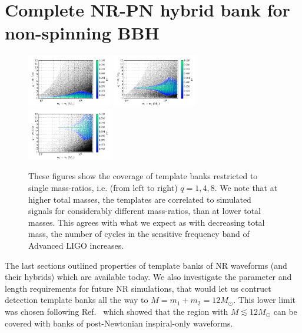 \section{Complete NR-PN hybrid bank for non-spinning BBH}\label{s1:futureNRpNhybridbank}

\begin{figure}
\begin{center}
\includegraphics[width=0.33\textwidth, trim=17 20 75 40]{figures/nrhybbank/bank_separate_q1_mtot200_match-tiny.png}
\includegraphics[width=0.33\textwidth, trim=17 20 75 40]{figures/nrhybbank/bank_separate_q4_mtot200_match-tiny.png}
\includegraphics[width=0.33\textwidth, trim=17 20 75 40]{figures/nrhybbank/bank_separate_q8_mtot200_match-tiny.png}
\caption{\label{fig:separate_q148} These figures show the coverage of template
  banks restricted to single mass-ratios, i.e. (from left to right) 
  $q = 1, 4, 8$. We note that at 
  higher total masses, the templates are correlated to simulated signals for
  considerably different mass-ratios, than at lower total masses. This agrees
  with what we expect as with decreasing total mass, the number of cycles in
  the sensitive frequency band of Advanced LIGO increases.} 
\end{center}
\end{figure}

The last sections outlined properties of template banks of NR
waveforms (and their hybrids) which are available today. 
We also investigate the parameter and length requirements for future NR 
simulations, that would let us contruct detection template banks all the
way to $M=m_1+m_2=12M_\odot$. This lower limit was chosen following 
Ref.~\cite{Brown:2012nn,CompTemplates2009} which showed that the region with
$M\lesssim 12M_\odot$ can be covered with banks of post-Newtonian inspiral-only
waveforms.

